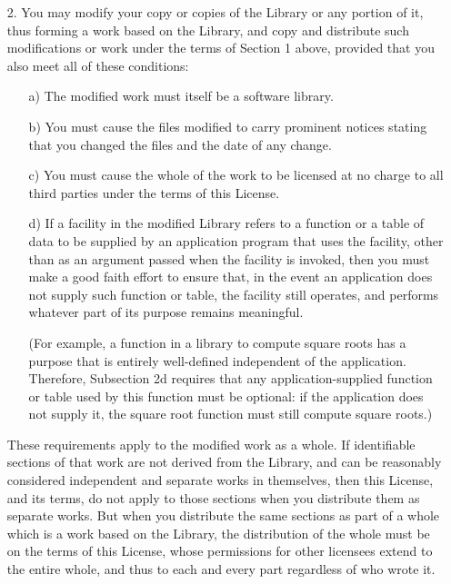 {\begin{itemize}
    You may charge a fee for the physical act of transferring a copy,
    and you may at your option offer warranty protection in exchange
    for a fee. 
    
  \item [2.] You may modify your copy or copies of the Library or any
    portion of it, thus forming a work based on the Library, and copy
    and distribute such modifications or work under the terms of
    Section 1 above, provided that you also meet all of these
    conditions:
    
    \begin{itemize}
    \item [a)] The modified work must itself be a software library.
    
    \item [b)] You must cause the files modified to carry prominent
      notices stating that you changed the files and the date of any
      change.
    
    \item [c)] You must cause the whole of the work to be licensed at
      no charge to all third parties under the terms of this License.
    
    \item [d)] If a facility in the modified Library refers to a
      function or a table of data to be supplied by an application
      program that uses the facility, other than as an argument passed
      when the facility is invoked, then you must make a good faith
      effort to ensure that, in the event an application does not
      supply such function or table, the facility still operates, and
      performs whatever part of its purpose remains meaningful.
    
      (For example, a function in a library to compute square roots
      has a purpose that is entirely well-defined independent of the
      application.  Therefore, Subsection 2d requires that any
      application-supplied function or table used by this function
      must be optional: if the application does not supply it, the
      square root function must still compute square roots.)
    
  \end{itemize}
  
  These requirements apply to the modified work as a whole.  If
  identifiable sections of that work are not derived from the Library,
  and can be reasonably considered independent and separate works in
  themselves, then this License, and its terms, do not apply to those
  sections when you distribute them as separate works.  But when you
  distribute the same sections as part of a whole which is a work
  based on the Library, the distribution of the whole must be on the
  terms of this License, whose permissions for other licensees extend
  to the entire whole, and thus to each and every part regardless of
  who wrote it.
  

\end{itemize}}
